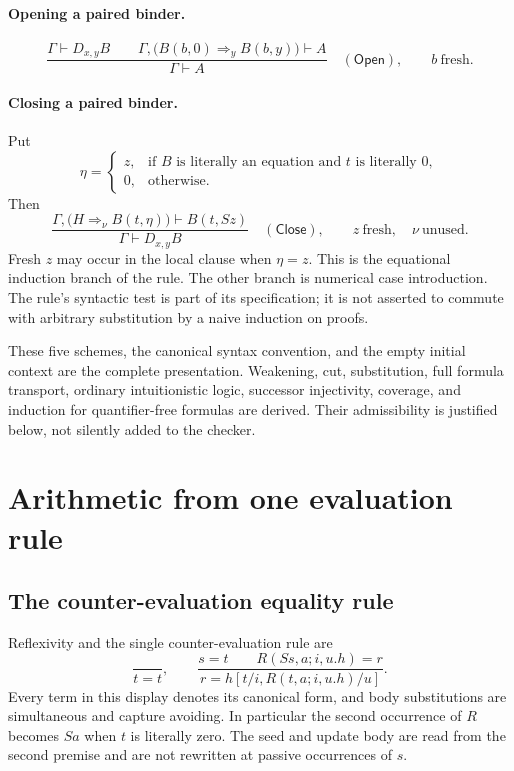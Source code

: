 \documentclass[10pt,letterpaper]{article}
\theoremstyle{definition}
\theoremstyle{remark}
\newcommand{\Open}{\mathsf{Open}}
\newcommand{\Close}{\mathsf{Close}}
\begin{document}
\paragraph{Opening a paired binder.}
\[
 \frac{\Gamma\vdash D_{x,y}B
       \qquad
       \Gamma,\bigl(B(b,0)\Rightarrow_y B(b,y)\bigr)\vdash A}
      {\Gamma\vdash A}
 \quad(\Open),
 \qquad b\ \text{fresh}.
\]

\paragraph{Closing a paired binder.}
Put
\[
 \eta=
 \begin{cases}
 z,&\text{if $B$ is literally an equation and $t$ is literally $0$},\\
 0,&\text{otherwise}.
 \end{cases}
\]
Then
\[
 \frac{\Gamma,\bigl(H\Rightarrow_\nu B(t,\eta)\bigr)
                    \vdash B(t,Sz)}
      {\Gamma\vdash D_{x,y}B}
 \quad(\Close),
 \qquad z\ \text{fresh},\quad \nu\ \text{unused}.
 \tag{Close}
\]
Fresh $z$ may occur in the local clause when $\eta=z$. This is the
equational induction branch of the rule. The other branch is numerical
case introduction. The rule's syntactic test is part of its specification;
it is not asserted to commute with arbitrary substitution by a naive
induction on proofs.

These five schemes, the canonical syntax convention, and the empty
initial context are the complete presentation. Weakening, cut, substitution,
full formula transport, ordinary intuitionistic logic, successor
injectivity, coverage, and induction for quantifier-free formulas are
derived. Their admissibility is justified below, not silently added to
the checker.

\section{Arithmetic from one evaluation rule}\label{sec:arithmetic}



\subsection{The counter-evaluation equality rule}

Reflexivity and the single counter-evaluation rule are
\[
 \frac{}{t=t},\qquad
 \frac{s=t\qquad R(Ss,a;i,u.h)=r}
      {r=h[t/i,R(t,a;i,u.h)/u]}.
\tag{CE}
\]
Every term in this display denotes its canonical form, and body substitutions
are simultaneous and capture avoiding. In particular the second occurrence
of $R$ becomes $Sa$ when $t$ is literally zero. The seed and update body
are read from the second premise and are not rewritten at passive occurrences
of $s$.
\end{document}
